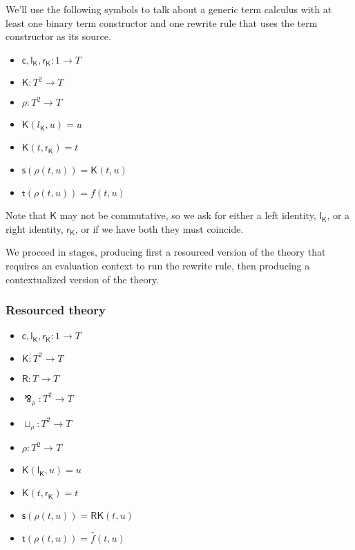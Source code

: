 \documentclass{llncs}
\renewcommand{\:}{\colon}
\begin{document}
We'll use the following symbols to talk about a generic term calculus
with at least one binary term constructor and one rewrite rule that
uses the term constructor as its source.

\begin{itemize}
  \item $\mathsf{c}, \mathsf{l}_{\mathsf{K}}, \mathsf{r}_{\mathsf{K}} : 1 \rightarrow T$
  \item $\mathsf{K} : T^{2} \rightarrow T$
  \item $\rho : T^{2} \rightarrow T$             %
  \item $\mathsf{K}(l_{\mathsf{K}}, u) = u$
  \item $\mathsf{K}(t, \mathsf{r}_{\mathsf{K}}) = t$
  \item $\mathsf{s}(\rho(t,u)) = \mathsf{K}(t, u)$
  \item $\mathsf{t}(\rho(t,u)) = f(t,u)$
\end{itemize}

Note that $\mathsf{K}$ may not be commutative, so we ask for either a left
identity, $\mathsf{l}_{\mathsf{K}}$, or a right identity, $\mathsf{r}_{\mathsf{K}}$, or if we have both they must
coincide.

We proceed in stages, producing first a resourced version of the
theory that requires an evaluation context to run the rewrite rule,
then producing a contextualized version of the theory.

\subsubsection{Resourced theory}


\begin{itemize}
  \item $\mathsf{c}, \mathsf{l}_{\mathsf{K}}, \mathsf{r}_{\mathsf{K}} : 1 \rightarrow T$
  \item $\mathsf{K} : T^{2} \rightarrow T$
  \item $\mathsf{R} : T \rightarrow T$
  \item $\bindnasrepma_{\rho} : T^{2} \rightarrow T$
  \item $\sqcup_{\rho} : T^{2} \rightarrow T$
  \item $\rho : T^{2} \rightarrow T$             %
  \item $\mathsf{K}(\mathsf{l}_{\mathsf{K}}, u) = u$
  \item $\mathsf{K}(t, \mathsf{r}_{\mathsf{K}}) = t$
  \item $\mathsf{s}(\rho(t,u)) = \mathsf{R}\mathsf{K}(t, u)$
  \item $\mathsf{t}(\rho(t,u)) = \hat{f}(t,u)$                    %
\end{itemize}
\end{document}

